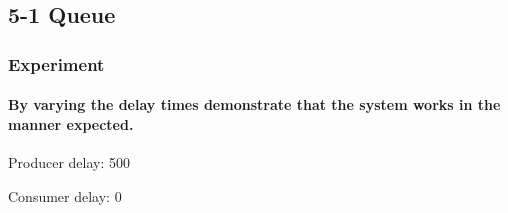 \subsection{5-1 Queue}

\subsubsection*{Experiment}

\paragraph{By varying the delay times demonstrate that the system works in the manner expected.}


Producer delay: 500

Consumer delay: 0

